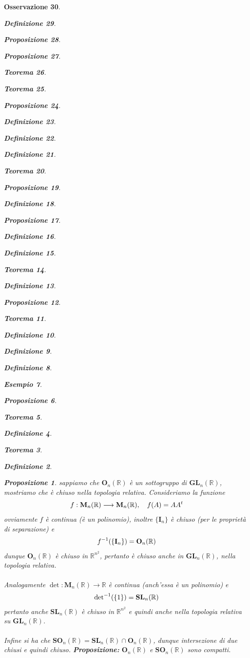 \documentclass[oneside, 11pt]{amsbook}
\makeatletter
\newcommand{\0}{{(0)}}
\newcommand{\3}{{(3)}}
\theoremstyle{colonplain}
\newtheorem{thm}{Teorema}[chapter]
\newtheorem{prop}[thm]{Proposizione}
\theoremstyle{colondefinition}
\newtheorem{defn}[thm]{Definizione}
\newtheorem{ex}[thm]{Esempio}
\theoremstyle{colonremark}
\newtheorem{rmk}[thm]{Osservazione}
\numberwithin{equation}{chapter}
\renewcommand{\proofname}{Dimostrazione}
\renewenvironment{proof}[1][\proofname]{\par
  \pushQED{\end{proof}}%
  \normalfont \topsep6\p@\@plus6\p@\relax
  \trivlist
  \item[\hskip\labelsep\bfseries #1:]\ignorespaces
}{%
  \popQED\endtrivlist\@endpefalse
}
\makeatother
\begin{document}
\begin{rmk}
\begin{defn}
\begin{prop}
\begin{prop}
\begin{thm}
\begin{thm}
\begin{prop}
\begin{defn}
\begin{defn}
\begin{defn}
\begin{thm}
\begin{prop}
\begin{defn}
\begin{prop}
\begin{defn}
\begin{defn}
\begin{thm}
\begin{defn}
\begin{prop}
\begin{thm}
\begin{defn}
\begin{defn}
\begin{defn}
\begin{ex}
\begin{prop}
\begin{thm}
\begin{defn}
\begin{thm}
\begin{defn}
\begin{prop}
\begin{proof} sappiamo che $\mathbf{O}_n(\mathbb{R})$ è un sottogruppo di $\mathbf{GL}_n(\mathbb{R})$, mostriamo che è chiuso nella topologia relativa. Consideriamo la funzione
\begin{align}
    f : \mathbf{M}_n(\mathbb{R}) \longrightarrow \mathbf{M}_n(\mathbb{R}), \quad f(A) = AA^t \notag
\end{align}
ovviamente $f$ è continua (è un polinomio), inoltre $\{ \mathbf{I}_n \}$ è chiuso (per le proprietà di separazione) e
\begin{align}
    f^{-1}(\{ \mathbf{I}_n \}) = \mathbf{O}_n(\mathbb{R}) \notag
\end{align}
dunque $\mathbf{O}_n(\mathbb{R})$ è chiuso in $\mathbb{R}^{n^2}$, pertanto è chiuso anche in $\mathbf{GL}_n(\mathbb{R})$, nella topologia relativa. \\ \\
Analogamente $\det : \mathbf{M}_n(\mathbb{R}) \longrightarrow \mathbb{R}$ è continua (anch'essa è un polinomio) e
\begin{align}
    \mathrm{det}^{-1}(\{ 1 \}) = \mathbf{SL}_n(\mathbb{R}) \notag
\end{align}
pertanto anche $\mathbf{SL}_n(\mathbb{R})$ è chiuso in $\mathbb{R}^{n^2}$ e quindi anche nella topologia relativa su $\mathbf{GL}_n(\mathbb{R})$. \\ \\
Infine si ha che $\mathbf{SO}_n(\mathbb{R}) = \mathbf{SL}_n(\mathbb{R}) \cap \mathbf{O}_n(\mathbb{R})$, dunque intersezione di due chiusi e quindi chiuso. \end{proof}
\textbf{Proposizione:} $\mathbf{O}_n(\mathbb{R})$ e $\mathbf{SO}_n(\mathbb{R})$ sono compatti. \\


\end{prop}
\end{defn}
\end{thm}
\end{defn}
\end{thm}
\end{prop}
\end{ex}
\end{defn}
\end{defn}
\end{defn}
\end{thm}
\end{prop}
\end{defn}
\end{thm}
\end{defn}
\end{defn}
\end{prop}
\end{defn}
\end{prop}
\end{thm}
\end{defn}
\end{defn}
\end{defn}
\end{prop}
\end{thm}
\end{thm}
\end{prop}
\end{prop}
\end{defn}
\end{rmk}
\end{document}

